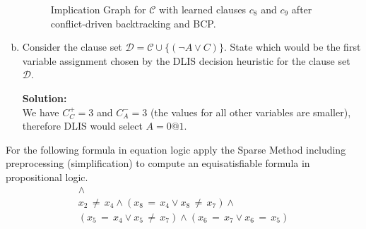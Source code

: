 \documentclass[11pt,a4paper]{uebung}
\newcommand{\solution}[1]{\par {\bf Solution:}\\#1}
\begin{document}
\begin{enumerate}[a)]
{\begin{figure}[h]
    \caption{Implication Graph for $\mathcal{C}$ with learned clauses $c_8$
      and $c_9$ after conflict-driven backtracking and BCP.}
    \label{fig:ig3}
  \end{figure}


}
\item Consider the clause set $\mathcal{D}= \mathcal{C} \cup \{ (\neg A \lor
  C) \}$. State which would be the first variable assignment chosen by the
  DLIS decision heuristic for the clause set $\mathcal{D}$.

\solution{
  We have $C^+_C=3$ and $C^-_A=3$ (the values for all other variables are
  smaller), therefore DLIS would select $A=0@1$.
}

\end{enumerate}




\newpage


For the following formula in equation logic apply the Sparse Method including
preprocessing (simplification) to compute an equisatisfiable formula in
propositional logic.
%
\def\eqs{\ensuremath{\,{=}\,}}
\def\neqs{\ensuremath{\,{\neq}\,}}
\begin{gather*}
  [ (x_1 \eqs x_2 \land x_1 \eqs x_3 ) \lor ( x_3 \eqs x_2 \land x_2 \eqs x_8)] \land \\
  x_2 \neqs x_4 \land 
  ( x_8 \eqs x_4 \lor x_8 \neqs x_7 ) \land \\
  ( x_5 \eqs x_4 \lor x_5 \neqs x_7 ) \land 
  ( x_6 \eqs x_7 \lor x_6 \eqs x_5)
\end{gather*}
\end{document}

